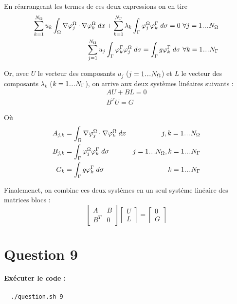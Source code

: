 \documentclass[french, 12pt, a4paper]{article}
\begin{document}
En réarrangeant les termes de ces deux expressions on en tire
\begin{eqnarray}
\sum_{k=1}^{N_\Omega} u_k \int_\ouvert \nabla \phi_j^\Omega
\cdot \nabla \phi_k^\Omega \; dx
%
+ \sum_{k=1}^{N_\Gamma} \lambda_k \int_\Gamma \phi_j^\Omega \phi_k^\Gamma \;
d\sigma = 0 & \forall j = 1 \sdots N_\Omega \\
%
\sum_{j=1}^{N_\Omega} u_j \int_\Gamma \phi_k^\Gamma \phi_j^\Omega \; d\sigma
= \int_\Gamma g \phi_k^\Gamma \; d\sigma &
\forall k = 1 \sdots N_\Gamma
\end{eqnarray}

Or, avec $U$ le vecteur des composants $u_j$ ($j = 1 \sdots N_\Omega$) et
$L$ le vecteur des composants $\lambda_k$ ($k = 1 \sdots N_\Gamma$), on arrive
aux deux systèmes linéaires suivants :
\begin{eqnarray}
AU + BL = 0 \\
B^T U = G
\end{eqnarray}

Où
\begin{alignat}{2}
A_{j,k} &= \int_\ouvert \nabla \phi_j^\Omega \cdot \nabla \phi_k^\Omega \; dx &
j,k = 1 \sdots N_\Omega\\
%
B_{j,k} &= \int_\Gamma \phi_j^\Omega \phi_k^\Gamma \; d\sigma &
j = 1 \sdots N_\Omega, k = 1 \sdots N_\Gamma \\
%
G_k &= \int_\Gamma g \phi_k^\Gamma \; d\sigma & k = 1 \sdots N_\Gamma
\end{alignat}

Finalemenet, on combine ces deux systèmes en un seul systéme linéaire des matrices blocs :
\[
\begin{bmatrix}
  A & B \\
  B^T & 0
\end{bmatrix}
\begin{bmatrix}
  U \\
  L
\end{bmatrix} =
\begin{bmatrix}
  0 \\
  G
\end{bmatrix}
\]


\section*{Question 9}

\paragraph{Exécuter le code :}
\begin{verbatim}
  ./question.sh 9
\end{verbatim}
\end{document}
